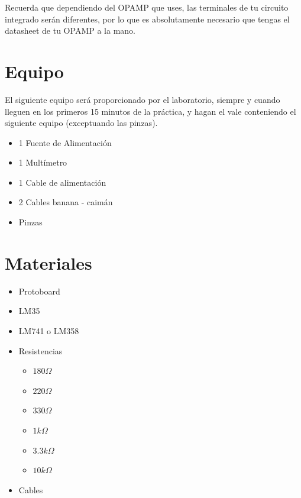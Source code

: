 			Recuerda que dependiendo del OPAMP que uses, las terminales de tu circuito integrado serán diferentes, por lo que es absolutamente necesario que tengas el datasheet de tu OPAMP a la mano.


\section{Equipo}

	El siguiente equipo será proporcionado por el laboratorio, siempre y cuando lleguen en los primeros 15 minutos de la práctica, y hagan el vale conteniendo el siguiente equipo (exceptuando las pinzas).

	\begin{itemize}
		\item 1 Fuente de Alimentación
		\item 1 Multímetro
		\item 1 Cable de alimentación
		\item 2 Cables banana - caimán
		\item Pinzas
	\end{itemize}


\section{Materiales}

	\begin{itemize}
		\item Protoboard
		\item LM35
		\item LM741 o LM358
		\item Resistencias
		\begin{itemize}
			\item $180 \Omega$
			\item $220 \Omega$
			\item $330 \Omega$
			\item $1 k\Omega$
			\item $3.3 k\Omega$
			\item $10 k\Omega$
		\end{itemize}
		\item Cables
	\end{itemize}

